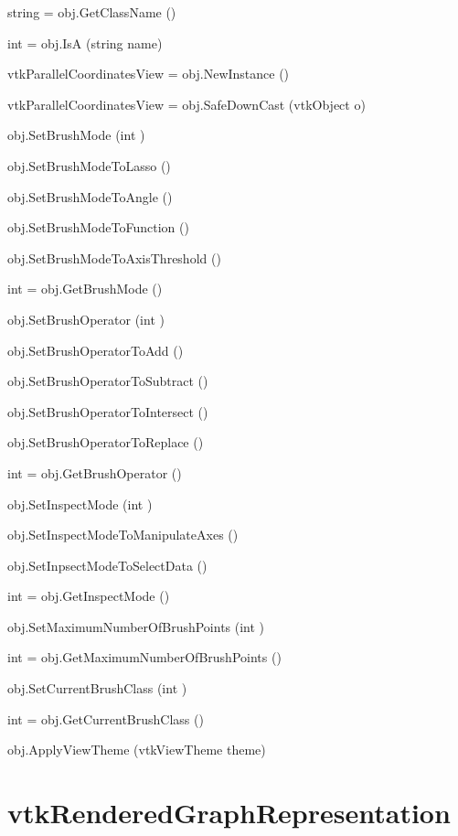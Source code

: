 \begin{DoxyItemize}
\item {\ttfamily string = obj.\-Get\-Class\-Name ()}  
\item {\ttfamily int = obj.\-Is\-A (string name)}  
\item {\ttfamily vtk\-Parallel\-Coordinates\-View = obj.\-New\-Instance ()}  
\item {\ttfamily vtk\-Parallel\-Coordinates\-View = obj.\-Safe\-Down\-Cast (vtk\-Object o)}  
\item {\ttfamily obj.\-Set\-Brush\-Mode (int )}  
\item {\ttfamily obj.\-Set\-Brush\-Mode\-To\-Lasso ()}  
\item {\ttfamily obj.\-Set\-Brush\-Mode\-To\-Angle ()}  
\item {\ttfamily obj.\-Set\-Brush\-Mode\-To\-Function ()}  
\item {\ttfamily obj.\-Set\-Brush\-Mode\-To\-Axis\-Threshold ()}  
\item {\ttfamily int = obj.\-Get\-Brush\-Mode ()}  
\item {\ttfamily obj.\-Set\-Brush\-Operator (int )}  
\item {\ttfamily obj.\-Set\-Brush\-Operator\-To\-Add ()}  
\item {\ttfamily obj.\-Set\-Brush\-Operator\-To\-Subtract ()}  
\item {\ttfamily obj.\-Set\-Brush\-Operator\-To\-Intersect ()}  
\item {\ttfamily obj.\-Set\-Brush\-Operator\-To\-Replace ()}  
\item {\ttfamily int = obj.\-Get\-Brush\-Operator ()}  
\item {\ttfamily obj.\-Set\-Inspect\-Mode (int )}  
\item {\ttfamily obj.\-Set\-Inspect\-Mode\-To\-Manipulate\-Axes ()}  
\item {\ttfamily obj.\-Set\-Inpsect\-Mode\-To\-Select\-Data ()}  
\item {\ttfamily int = obj.\-Get\-Inspect\-Mode ()}  
\item {\ttfamily obj.\-Set\-Maximum\-Number\-Of\-Brush\-Points (int )}  
\item {\ttfamily int = obj.\-Get\-Maximum\-Number\-Of\-Brush\-Points ()}  
\item {\ttfamily obj.\-Set\-Current\-Brush\-Class (int )}  
\item {\ttfamily int = obj.\-Get\-Current\-Brush\-Class ()}  
\item {\ttfamily obj.\-Apply\-View\-Theme (vtk\-View\-Theme theme)}  
\end{DoxyItemize}\hypertarget{vtkviews_vtkrenderedgraphrepresentation}{}\section{vtk\-Rendered\-Graph\-Representation}\label{vtkviews_vtkrenderedgraphrepresentation}
